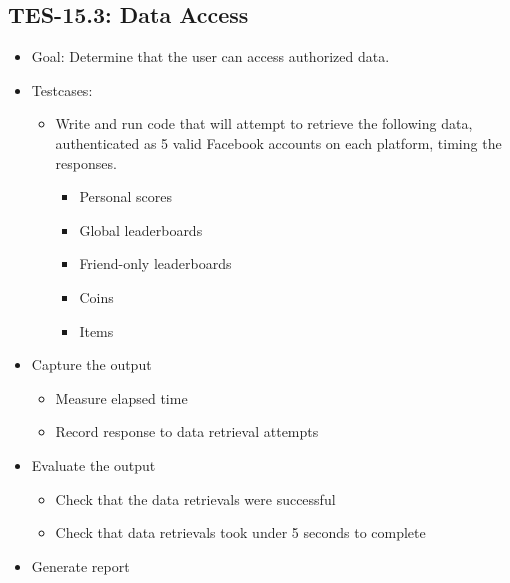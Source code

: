 \subsection{TES-15.3: Data Access}
\label{subsec:accessdata}
\begin{itemize}
\item Goal: Determine that the user can access authorized data.
\item Testcases: 
\begin{itemize}
\item Write and run code that will attempt to retrieve the following data, 
authenticated as 5 valid Facebook accounts on each platform, 
timing the responses.
\begin{itemize}
\item Personal scores
\item Global leaderboards
\item Friend-only leaderboards
\item Coins
\item Items
\end{itemize}
\end{itemize}
\item Capture the output 
\begin{itemize}
\item Measure elapsed time 
\item Record response to data retrieval attempts
\end{itemize}
\item Evaluate the output 
\begin{itemize}
\item Check that the data retrievals were successful
\item Check that data retrievals took under 5 seconds to complete
\end{itemize}
\item Generate report 
\end{itemize}

